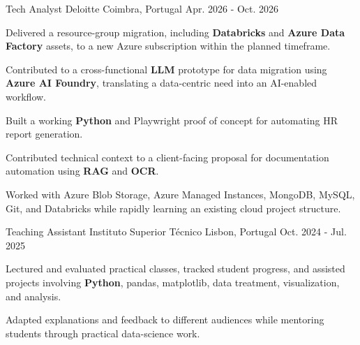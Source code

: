 \begin{cventries}

  \cventry
    {Tech Analyst}
    {Deloitte}
    {Coimbra, Portugal}
    {Apr. 2026 - Oct. 2026}
    {
      \begin{cvitems}
        \item {Delivered a resource-group migration, including \textbf{Databricks} and \textbf{Azure Data Factory} assets, to a new Azure subscription within the planned timeframe.}
        \item {Contributed to a cross-functional \textbf{LLM} prototype for data migration using \textbf{Azure AI Foundry}, translating a data-centric need into an AI-enabled workflow.}
        \item {Built a working \textbf{Python} and Playwright proof of concept for automating HR report generation.}
        \item {Contributed technical context to a client-facing proposal for documentation automation using \textbf{RAG} and \textbf{OCR}.}
        \item {Worked with Azure Blob Storage, Azure Managed Instances, MongoDB, MySQL, Git, and Databricks while rapidly learning an existing cloud project structure.}
      \end{cvitems}
    }
    {}

  \cventry
    {Teaching Assistant}
    {Instituto Superior Técnico}
    {Lisbon, Portugal}
    {Oct. 2024 - Jul. 2025}
    {
      \begin{cvitems}
        \item {Lectured and evaluated practical classes, tracked student progress, and assisted projects involving \textbf{Python}, pandas, matplotlib, data treatment, visualization, and analysis.}
        \item {Adapted explanations and feedback to different audiences while mentoring students through practical data-science work.}
      \end{cvitems}
    }
    {}
\end{cventries}
